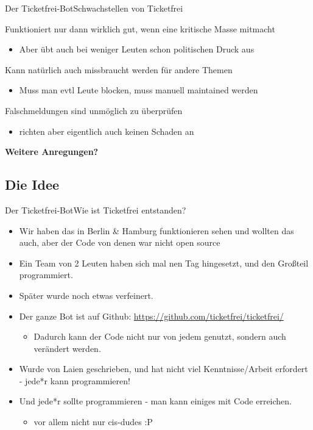 \documentclass[10pt]{beamer}
\begin{document}
{\begin{frame}{Der Ticketfrei-Bot}{Schwachstellen von Ticketfrei}
\begin{block}{Funktioniert nur dann wirklich gut, wenn eine kritische Masse mitmacht}
  \begin{itemize}
    \item Aber übt auch bei weniger Leuten schon politischen Druck aus
  \end{itemize}
\end{block}

\begin{block}{Kann natürlich auch missbraucht werden für andere Themen}
  \begin{itemize}
    \item Muss man evtl Leute blocken, muss manuell maintained werden
  \end{itemize}
\end{block}

\begin{block}{Falschmeldungen sind unmöglich zu überprüfen}
  \begin{itemize}
    \item richten aber eigentlich auch keinen Schaden an
  \end{itemize}
\end{block}

\textbf{Weitere Anregungen?}

\end{frame}

\subsection{Die Idee}
\begin{frame}{Der Ticketfrei-Bot}{Wie ist Ticketfrei entstanden?}

\begin{itemize}
    \item<1-> Wir haben das in Berlin \& Hamburg funktionieren sehen und wollten das auch, aber der Code von denen war nicht open source
    \item<1-> Ein Team von 2 Leuten haben sich mal nen Tag hingesetzt, und den Großteil programmiert.
    \item<1-> Später wurde noch etwas verfeinert.
    \item<2-> Der ganze Bot ist auf Github: \url{https://github.com/ticketfrei/ticketfrei/}
  \begin{itemize}
    \item Dadurch kann der Code nicht nur von jedem genutzt, sondern auch verändert werden.
  \end{itemize}
    \item<2-> Wurde von Laien geschrieben, und hat nicht viel Kenntnisse/Arbeit erfordert - jede*r kann programmieren!
	\item<2-> Und jede*r sollte programmieren - man kann einiges mit Code erreichen.
  \begin{itemize}
    \item vor allem nicht nur cis-dudes :P
  \end{itemize}
\end{itemize}
    


\end{frame}}
\end{document}
